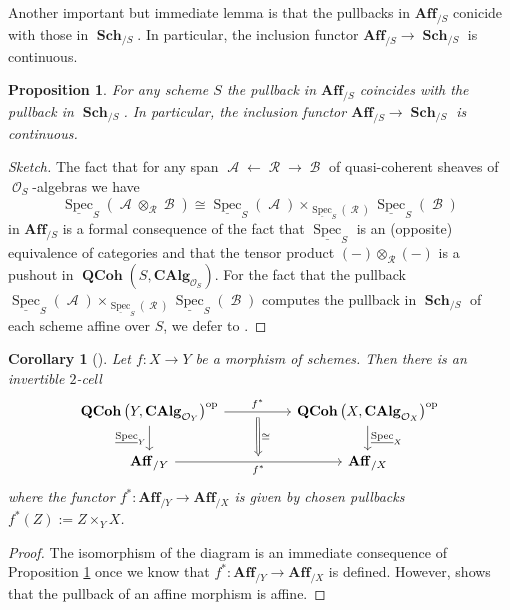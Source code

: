 \documentclass{amsart}
\newtheorem{proposition}[equation]{Proposition}
\newtheorem{corollary}[equation]{Corollary}
\theoremstyle{definition}
\DeclareMathOperator{\Ascr}{\mathscr{A}}
\DeclareMathOperator{\Bscr}{\mathscr{B}}
\DeclareMathOperator{\Rscr}{\mathscr{R}}
\DeclareMathOperator{\Ocal}{\mathcal{O}}
\DeclareMathOperator{\op}{op}
\DeclareMathOperator{\Spec}{Spec}
\newcommand{\CAlg}[1]{\mathbf{CAlg}_{#1}}
\newcommand{\RelSpec}[1]{\underline{\Spec}_{#1}}
\DeclareMathOperator{\Sch}{\mathbf{Sch}}
\DeclareMathOperator{\QCoh}{\mathbf{QCoh}}
\numberwithin{equation}{subsection}
\begin{document}
Another important but immediate lemma is that the pullbacks in $\mathbf{Aff}_{/S}$ conicide with those in $\Sch_{/S}$. In particular, the inclusion functor $\mathbf{Aff}_{/S} \to \Sch_{/S}$ is continuous.
\begin{proposition}\label{Prop: Section Background Scheme: Incl of Aff is cont}
For any scheme $S$ the pullback in $\mathbf{Aff}_{/S}$ coincides with the pullback in $\Sch_{/S}$. In particular, the inclusion functor $\mathbf{Aff}_{/S} \to \Sch_{/S}$ is continuous.
\end{proposition}
\begin{proof}[Sketch]
The fact that for any span $\Ascr\leftarrow \Rscr \rightarrow \Bscr$ of quasi-coherent sheaves of $\Ocal_S$-algebras we have
\[
\RelSpec{S}\left(\Ascr \otimes_{\Rscr} \Bscr\right) \cong \RelSpec{S}(\Ascr) \times_{\RelSpec{S}(\Rscr)} \RelSpec{S}(\Bscr)
\]
in $\mathbf{Aff}_{/S}$ is a formal consequence of the fact that $\RelSpec{S}$ is an (opposite) equivalence of categories and that the tensor product $(-) \otimes_{\Rscr}(-)$ is a pushout in $\QCoh(S,\CAlg{\Ocal_S})$. For the fact that the pullback $\RelSpec{S}(\Ascr) \times_{\RelSpec{S}(\Rscr)}\RelSpec{S}(\Bscr)$ computes the pullback in $\Sch_{/S}$ of each scheme affine over $S$, we defer to \cite[Proposition 1.4.6]{EGA2}. 
\end{proof}
\begin{corollary}[{\cite[Corollaire 1.5.2]{EGA2}}]\label{Cor: Section Background Scheme: The pullback iso for relspec}
Let $f:X \to Y$ be a morphism of schemes. Then there is an invertible $2$-cell
\[
\begin{tikzcd}
\QCoh\left(Y,\CAlg{\Ocal_Y}\right)^{\op} \ar[rr, ""{name = U}]{}{f^{\ast}} \ar[d, swap]{}{\RelSpec{Y}} & &\QCoh\left(X,\CAlg{\Ocal_X}\right)^{\op} \ar[d]{}{\RelSpec{X}} \\
\mathbf{Aff}_{/Y} \ar[rr, swap, ""{name = D}]{}{f^{\ast}} & & \mathbf{Aff}_{/X}
\ar[from = U, to = D, Rightarrow, shorten <= 4pt, shorten >=4pt]{}{\cong}
\end{tikzcd}
\]
where the functor $f^{\ast}:\mathbf{Aff}_{/Y} \to \mathbf{Aff}_{/X}$ is given by chosen pullbacks $f^{\ast}(Z) := Z \times_Y X$.
\end{corollary}
\begin{proof}
The isomorphism of the diagram is an immediate consequence of Proposition \ref{Prop: Section Background Scheme: Incl of Aff is cont} once we know that $f^{\ast}:\mathbf{Aff}_{/Y} \to \mathbf{Aff}_{/X}$ is defined. However, \cite[Proposition 1.5.1]{EGA2} shows that the pullback of an affine morphism is affine.
\end{proof}
\end{document}
